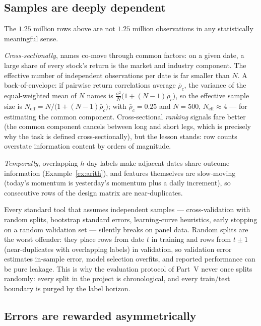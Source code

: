 \subsection{Samples are deeply dependent}\label{sec:dependence}

The $1.25$ million rows above are not $1.25$ million observations in any
statistically meaningful sense.

\emph{Cross-sectionally}, names co-move through common factors: on a given
date, a large share of every stock's return is the market and industry
component. The effective number of independent observations per date is far
smaller than $N$. A back-of-envelope: if pairwise return correlations average
$\bar\rho_c$, the variance of the equal-weighted mean of $N$ names is
$\frac{\sigma^2}{N}\bigl(1 + (N-1)\bar\rho_c\bigr)$, so the effective sample
size is $N_{\text{eff}} = N / \bigl(1 + (N-1)\bar\rho_c\bigr)$; with
$\bar\rho_c = 0.25$ and $N = 500$, $N_{\text{eff}} \approx 4$ --- for
estimating the common component. Cross-sectional \emph{ranking} signals fare
better (the common component cancels between long and short legs, which is
precisely why the task is defined cross-sectionally), but the lesson stands:
row counts overstate information content by orders of magnitude.

\emph{Temporally}, overlapping $h$-day labels make adjacent dates share
outcome information (Example~\ref{ex:arith}), and features themselves are
slow-moving (today's momentum is yesterday's momentum plus a daily
increment), so consecutive rows of the design matrix are near-duplicates.

\begin{whatbreaks}
Every standard tool that assumes independent samples --- cross-validation
with random splits, bootstrap standard errors, learning-curve heuristics,
early stopping on a random validation set --- silently breaks on panel data.
Random splits are the worst offender: they place rows from date $t$ in
training and rows from $t\pm1$ (near-duplicates with overlapping labels) in
validation, so validation error estimates in-sample error, model selection
overfits, and reported performance can be pure leakage. This is why the
evaluation protocol of Part~V never once splits randomly: every split in the
project is chronological, and every train/test boundary is purged by the
label horizon.
\end{whatbreaks}

\subsection{Errors are rewarded asymmetrically}\label{sec:ratchet}

